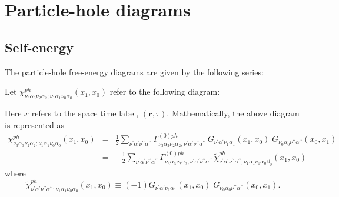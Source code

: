 \chapter{Particle-hole diagrams}
\label{chapter:particle-hole}

\section{Self-energy}
The particle-hole free-energy diagrams are given by
the following series:

\begin{center}
\end{center}

Let $\chi^{ph}_{\nu_3\alpha_3 \nu_2 \alpha_2; 
\nu_1\alpha_1 \nu_0\alpha_0}(x_1,x_0)$ refer
to the following diagram:

\begin{center}
\end{center}

Here $x$ refers to the space time label, $(\mathbf{r},\tau)$.
Mathematically, the above diagram is represented as
\begin{eqnarray}
\label{k_ph}
\chi^{ph}_{\nu_3\alpha_3 \nu_2 \alpha_2; \nu_1 \alpha_1 \nu_0\alpha_0}(x_1,x_0) 
& = & \frac{1}{2} \sum_{\nu^{\prime}\alpha^{\prime}\nu^{\prime\prime} \alpha^{\prime\prime}}
\Gamma^{(0)ph}_{\nu_3\alpha_3\nu_2\alpha_2; 
\nu^{\prime}\alpha^{\prime}\nu^{\prime\prime}\alpha^{\prime\prime}}\,
G_{\nu^{\prime}\alpha^{\prime}\nu_1 \alpha_1}(x_1,x_0) \; G_{\nu_0\alpha_0 
\nu^{\prime\prime}\alpha^{\prime\prime}}(x_0,x_1) \\
& = & -\frac{1}{2}\sum_{\nu^{\prime}\alpha^{\prime}\nu^{\prime\prime} \alpha^{\prime\prime}} 
\Gamma^{(0)ph}_{\nu_3\alpha_3 \nu_2 \alpha_2; \nu^{\prime}\alpha^{\prime}
\nu^{\prime\prime}\alpha^{\prime\prime}}\,
\tilde{\chi}^{ph}_{\nu^{\prime}\alpha^{\prime}\nu^{\prime\prime} \alpha^{\prime\prime}; 
\nu_1\alpha_1\nu_0\alpha_0 \beta_0}(x_1,x_0)
\end{eqnarray}
where
\begin{equation}
\label{chi_ph}
\tilde{\chi}^{ph}_{\nu^{\prime}\alpha^{\prime}\nu^{\prime\prime}\alpha^{\prime\prime}; 
\nu_1\alpha_1 \nu_0\alpha_0}(x_1,x_0) \equiv
(-1) G_{\nu^{\prime}\alpha^{\prime}\nu_1 \alpha_1}(x_1,x_0) \; 
G_{\nu_0\alpha_0 \nu^{\prime\prime}\alpha^{\prime\prime}}(x_0,x_1).
\end{equation}

